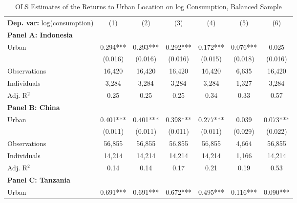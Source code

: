 \begin{table}[htbp] \centering \begin{threeparttable}
 \caption{OLS Estimates of the Returns to Urban Location on log Consumption, Balanced Sample} 
 \label{tab:OLS_cons_urb_bal} 
\begin{tabular}{l cccccc} \toprule  \textbf{Dep. var:}  log(consumption) 
                    &\multicolumn{1}{c}{(1)}   &\multicolumn{1}{c}{(2)}   &\multicolumn{1}{c}{(3)}   &\multicolumn{1}{c}{(4)}   &\multicolumn{1}{c}{(5)}   &\multicolumn{1}{c}{(6)}   \\
\textbf{Panel A: Indonesia} \\
Urban               &       0.294***&       0.293***&       0.292***&       0.172***&       0.076***&       0.025   \\
                    &     (0.016)   &     (0.016)   &     (0.016)   &     (0.015)   &     (0.018)   &     (0.016)   \\
\addlinespace
Observations        &      16,420   &      16,420   &      16,420   &      16,420   &       6,635   &      16,420   \\
Individuals         &       3,284   &       3,284   &       3,284   &       3,284   &       1,327   &       3,284   \\
Adj. R$^{2}$        &        0.25   &        0.25   &        0.25   &        0.34   &        0.33   &        0.57   \\
\cmidrule{2 -7}
\textbf{Panel B: China} \\
Urban               &       0.401***&       0.401***&       0.398***&       0.277***&       0.039   &       0.073***\\
                    &     (0.011)   &     (0.011)   &     (0.011)   &     (0.011)   &     (0.029)   &     (0.022)   \\
\addlinespace
Observations        &      56,855   &      56,855   &      56,855   &      56,855   &       4,664   &      56,855   \\
Individuals         &      14,214   &      14,214   &      14,214   &      14,214   &       1,166   &      14,214   \\
Adj. R$^{2}$        &        0.14   &        0.14   &        0.17   &        0.21   &        0.19   &        0.53   \\
\cmidrule{2-7}
\textbf{Panel C: Tanzania} \\
Urban               &       0.691***&       0.691***&       0.672***&       0.495***&       0.116***&       0.090***\\

\end{tabular}
\end{threeparttable}
\end{table}
